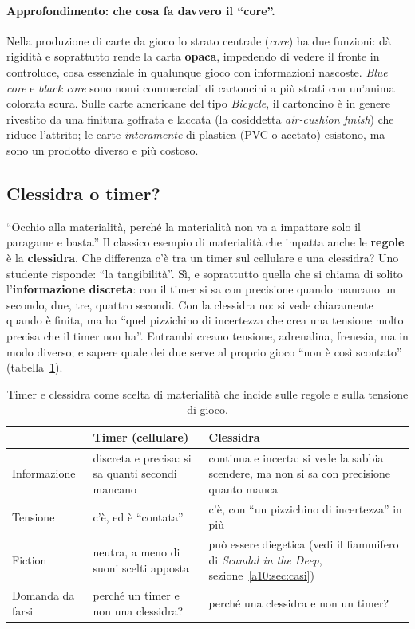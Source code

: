 \paragraph{Approfondimento: che cosa fa davvero il ``core''.} Nella produzione di carte
da gioco lo strato centrale (\emph{core}) ha due funzioni: dà rigidità e soprattutto
rende la carta \textbf{opaca}, impedendo di vedere il fronte in controluce, cosa
essenziale in qualunque gioco con informazioni nascoste. \emph{Blue core} e
\emph{black core} sono nomi commerciali di cartoncini a più strati con un'anima
colorata scura. Sulle carte americane del tipo \emph{Bicycle}, il cartoncino è in
genere rivestito da una finitura goffrata e laccata (la cosiddetta \emph{air-cushion
finish}) che riduce l'attrito; le carte \emph{interamente} di plastica (PVC o acetato)
esistono, ma sono un prodotto diverso e più costoso.

\subsection{Clessidra o timer?}

``Occhio alla materialità, perché la materialità non va a impattare solo il paragame e
basta.'' Il classico esempio di materialità che impatta anche le \textbf{regole} è la
\textbf{clessidra}. Che differenza c'è tra un timer sul cellulare e una clessidra? Uno
studente risponde: ``la tangibilità''. Sì, e soprattutto quella che si chiama di solito
l'\textbf{informazione discreta}: con il timer si sa con precisione quando mancano un
secondo, due, tre, quattro secondi. Con la clessidra no: si vede chiaramente quando è
finita, ma ha ``quel pizzichino di incertezza che crea una tensione molto precisa che il
timer non ha''. Entrambi creano tensione, adrenalina, frenesia, ma in modo diverso; e
sapere quale dei due serve al proprio gioco ``non è così scontato''
(tabella~\ref{a10:tab:clessidra}).

\begin{table}[htbp]
\centering
\small
\begin{tabular}{@{}p{3cm}p{5cm}p{5cm}@{}}
\toprule
 & \textbf{Timer (cellulare)} & \textbf{Clessidra} \\
\midrule
Informazione & discreta e precisa: si sa quanti secondi mancano & continua e
incerta: si vede la sabbia scendere, ma non si sa con precisione quanto manca \\
Tensione & c'è, ed è ``contata'' & c'è, con ``un pizzichino di incertezza'' in più \\
Fiction & neutra, a meno di suoni scelti apposta & può essere diegetica (vedi il
fiammifero di \emph{Scandal in the Deep}, sezione~\ref{a10:sec:casi}) \\
Domanda da farsi & perché un timer e non una clessidra? & perché una clessidra e non
un timer? \\
\bottomrule
\end{tabular}
\caption{Timer e clessidra come scelta di materialità che incide sulle regole e sulla
tensione di gioco.}
\label{a10:tab:clessidra}
\end{table}

